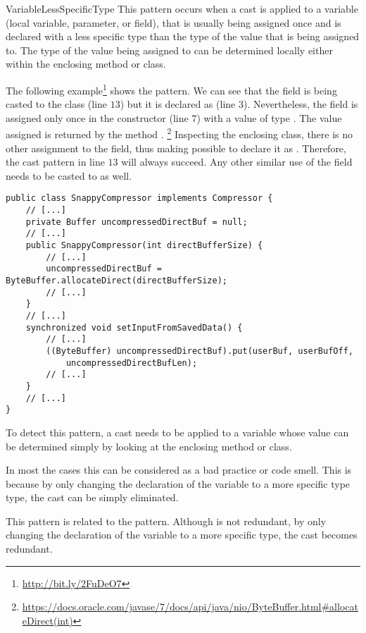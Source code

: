 \begin{pattern}{VariableLessSpecificType}
This pattern occurs when a cast is applied to a variable (local variable,
parameter, or field),
that is usually being assigned once and
is declared with a less specific type than the type of the value 
that is being assigned to.
The type of the value being assigned to can be determined locally
either within the enclosing method or class.

\instances{}
The following example\footnote{\url{http://bit.ly/2FuDeO7}} shows the \thisp{} pattern.
We can see that the field  is being casted to the  class (line $13$) but it is declared as  (line $3$).
Nevertheless, the field is assigned only once in the constructor (line $7$)
with a value of type .
The value assigned is returned by the method
.%
\footnote{\url{https://docs.oracle.com/javase/7/docs/api/java/nio/ByteBuffer.html\#allocateDirect(int)}}
Inspecting the enclosing class, there is no other assignment to the
 field,
thus making possible to declare it as .
Therefore, the cast pattern in line $13$ will always succeed.
Any other similar use of the  field needs to be casted to as well.

\begin{verbatim}
public class SnappyCompressor implements Compressor {
    // [...]
    private Buffer uncompressedDirectBuf = null;
    // [...]
    public SnappyCompressor(int directBufferSize) {
        // [...]
        uncompressedDirectBuf = ByteBuffer.allocateDirect(directBufferSize);
        // [...]
    }
    // [...]
    synchronized void setInputFromSavedData() {
        // [...]
        ((ByteBuffer) uncompressedDirectBuf).put(userBuf, userBufOff,
            uncompressedDirectBufLen);
        // [...]
    }
    // [...]
}
\end{verbatim}

\detection{}
To detect this pattern, a cast needs to be applied to a variable whose
value can be determined simply by looking at
the enclosing method or class.

\discussion{}
In most the cases this can be considered as a bad practice or
code smell.
This is because by only changing the declaration of the variable
to a more specific type type, the cast can be simply eliminated.

\related{}
This pattern is related to the  pattern.
Although \thisp{} is not redundant,
by only changing the declaration of the variable to a more specific type,
the cast becomes redundant.

\end{pattern}
